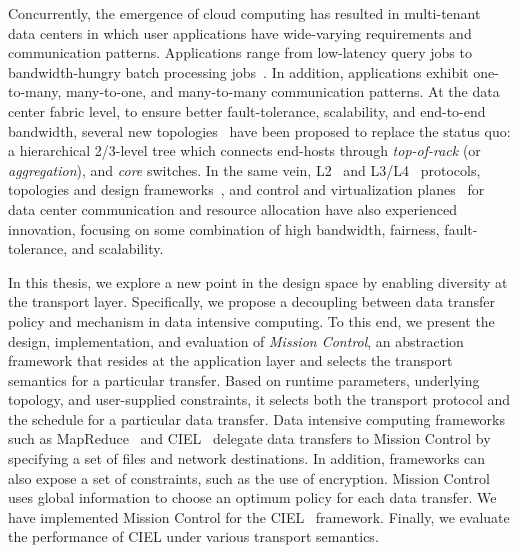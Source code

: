 \documentclass[a4paper,12pt,twoside,openright]{report}
\begin{document}
Concurrently, the emergence of cloud computing has resulted in multi-tenant data
centers in which user applications have wide-varying requirements and
communication patterns. Applications range from low-latency query jobs to
bandwidth-hungry batch processing jobs~\cite{Alizadeh:2010:DCT}. In addition,
applications exhibit one-to-many, many-to-one, and many-to-many communication
patterns. At the data center fabric level, to ensure better fault-tolerance,
scalability, and end-to-end bandwidth, several new
topologies~\cite{Al-Fares:2008:SCD,Guo:2008:DSF,Guo:2009:BHP,Greenberg:2009:VSF}
have been proposed to replace the status quo: a hierarchical 2/3-level tree
which connects end-hosts through \emph{top-of-rack} (or \emph{aggregation}), and
\emph{core} switches. In the same vein,
L2~\cite{Mudigonda:2010:SCD,Vattikonda:2012:PTD} and
L3/L4~\cite{Alizadeh:2010:DCT,Vasudevan:2009:SEF,Raiciu:2010:DCN,Wilson:2011:BNL,Wu:2010:IIC}
protocols, topologies and design
frameworks~\cite{Singla:2011:JND,Al-Fares:2008:SCD,Guo:2008:DSF,Guo:2009:BHP,Greenberg:2009:VSF,Mudigonda:2011:TFC,Chen:2010:GAA},
and control and virtualization
planes~\cite{NiranjanMysore:2009:PSF,Mudigonda:2011:NSM,Guo:2010:SDC,Ballani:2011:TPD,Shieh:2011:SDC,Rodrigues:2011:GSB,Al-Fares:2010:HDF}
for data center communication and resource allocation have also experienced
innovation, focusing on some combination of high bandwidth, fairness,
fault-tolerance, and scalability.

In this thesis, we explore a new point in the design space by enabling diversity
at the transport layer. Specifically, we propose a decoupling between data
transfer policy and mechanism in data intensive computing. To this end, we
present the design, implementation, and evaluation of \emph{Mission Control}, an
abstraction framework that resides at the application layer and selects the
transport semantics for a particular transfer. Based on runtime parameters,
underlying topology, and user-supplied constraints, it selects both the
transport protocol and the schedule for a particular data transfer.
Data intensive computing frameworks such as MapReduce~\cite{Dean:2004:MSD} and
CIEL~\cite{Murray:2011:CUE} delegate data transfers to Mission Control by
specifying a set of files and network destinations. In addition, frameworks can
also expose a set of constraints, such as the use of encryption. Mission Control
uses global information to choose an optimum policy for each data transfer. We
have implemented Mission Control for the CIEL~\cite{Murray:2011:CUE} framework.
Finally, we evaluate the performance of CIEL under various transport semantics.
\end{document}
